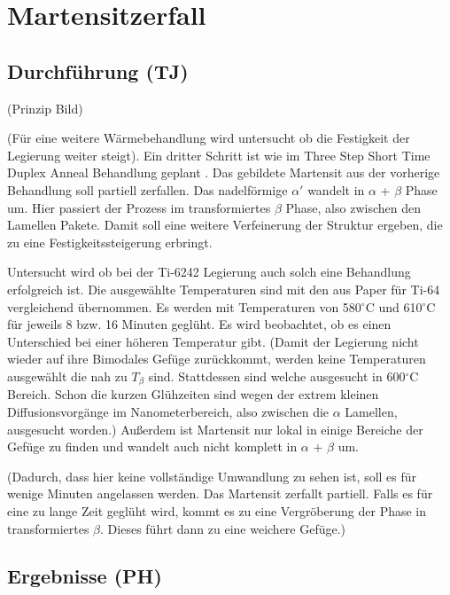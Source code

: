 \chapter{Martensitzerfall}

\section{Durchführung (TJ)}

(Prinzip Bild)


(Für eine weitere Wärmebehandlung wird untersucht ob die Festigkeit der Legierung weiter steigt). Ein dritter Schritt ist wie im Three Step Short Time Duplex Anneal Behandlung geplant \cite{Short Time Duplex Heat Treatment}. Das gebildete Martensit aus der vorherige Behandlung soll partiell zerfallen. Das nadelförmige $\alpha'$ wandelt in $\alpha$ + $\beta$ Phase um. Hier passiert der Prozess im transformiertes $\beta$ Phase, also zwischen den Lamellen Pakete. Damit soll eine weitere Verfeinerung der Struktur ergeben, die zu eine Festigkeitssteigerung erbringt.

Untersucht wird ob bei der Ti-6242 Legierung auch solch eine Behandlung erfolgreich ist. Die ausgewählte Temperaturen sind mit den aus  Paper für Ti-64 \cite{Paper..} vergleichend übernommen. Es werden mit Temperaturen von 580$^\circ$C und 610$^\circ$C für jeweils 8 bzw. 16 Minuten geglüht. Es wird beobachtet, ob es einen Unterschied bei einer höheren Temperatur gibt.  (Damit der Legierung nicht wieder auf ihre Bimodales Gefüge zurückkommt, werden keine Temperaturen ausgewählt die nah zu $T_{\beta}$ sind. Stattdessen sind welche ausgesucht in 600$^\circ$C Bereich. Schon die kurzen Glühzeiten sind wegen der extrem kleinen Diffusionsvorgänge im Nanometerbereich, also zwischen die $\alpha$ Lamellen, ausgesucht worden.) Außerdem ist Martensit nur lokal in einige Bereiche der Gefüge zu finden und wandelt auch nicht komplett in $\alpha$ + $\beta$ um.

(Dadurch, dass hier keine vollständige Umwandlung zu sehen ist, soll es für wenige Minuten angelassen werden. Das Martensit zerfallt partiell. Falls es für eine zu lange Zeit geglüht wird, kommt es zu eine Vergröberung der Phase in transformiertes $\beta$. Dieses führt dann zu eine weichere Gefüge.)



\section{Ergebnisse (PH)}

